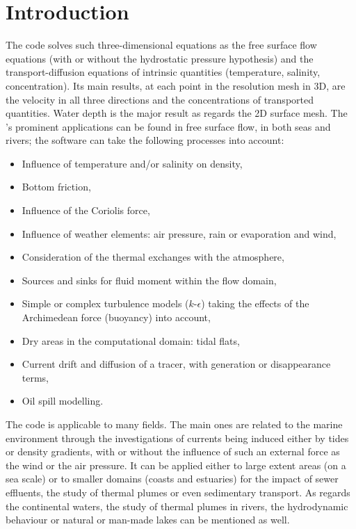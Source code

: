 \chapter{Introduction}

The  code solves such three-dimensional equations as the free
surface flow equations (with or without the hydrostatic pressure hypothesis)
and the transport-diffusion equations of intrinsic quantities (temperature,
salinity, concentration). Its main results, at each point in the resolution
mesh in 3D, are the velocity in all three directions and the concentrations of
transported quantities. Water depth is the major result as regards the 2D
surface mesh. The 's prominent applications can be found in free
surface flow, in both seas and rivers; the software can take the following
processes into account:

\begin{itemize}
\item Influence of temperature and/or salinity on density,
\item Bottom friction,
\item Influence of the Coriolis force,
\item Influence of weather elements: air pressure, rain or evaporation and
wind,
\item Consideration of the thermal exchanges with the atmosphere,
\item Sources and sinks for fluid moment within the flow domain,
\item Simple or complex turbulence models ($k$-$\epsilon$) taking the
effects of the Archimedean force (buoyancy) into account,
\item Dry areas in the computational domain: tidal flats,
\item Current drift and diffusion of a tracer, with generation or
disappearance terms,
\item Oil spill modelling.
\end{itemize}

The code is applicable to many fields. The main ones are related to the marine
environment through the investigations of currents being induced either by
tides or density gradients, with or without the influence of such an external
force as the wind or the air pressure. It can be applied either to large extent
areas (on a sea scale) or to smaller domains (coasts and estuaries) for the
impact of sewer effluents, the study of thermal plumes or even sedimentary
transport. As regards the continental waters, the study of thermal plumes in
rivers, the hydrodynamic behaviour or natural or man-made lakes can be
mentioned as well.


